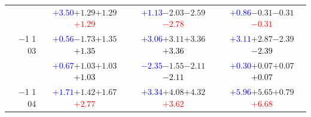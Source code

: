 \documentclass[compress]{beamer}
\begin{document}
\begin{frame}
\begin{tabular}{r | c | c | c}
          & \textcolor{blue}{$+3.50$}\hspace{0.1 cm}$+1.29$\hspace{0.1 cm}$+1.29$\hspace{0.1 cm}\textcolor{red}{$+1.29$} & \textcolor{blue}{$+1.13$}\hspace{0.1 cm}$-2.03$\hspace{0.1 cm}$-2.59$\hspace{0.1 cm}\textcolor{red}{$-2.78$} & \textcolor{blue}{$+0.86$}\hspace{0.1 cm}$-0.31$\hspace{0.1 cm}$-0.31$\hspace{0.1 cm}\textcolor{red}{$-0.31$} \\
$-$1 1 03 & \textcolor{blue}{$+0.56$}\hspace{0.1 cm}$-1.73$\hspace{0.1 cm}$+1.35$\hspace{0.1 cm}\textcolor{black}{$+1.35$} & \textcolor{blue}{$+3.06$}\hspace{0.1 cm}$+3.11$\hspace{0.1 cm}$+3.36$\hspace{0.1 cm}\textcolor{black}{$+3.36$} & \textcolor{blue}{$+3.11$}\hspace{0.1 cm}$+2.87$\hspace{0.1 cm}$-2.39$\hspace{0.1 cm}\textcolor{black}{$-2.39$} \\
          & \textcolor{blue}{$+0.67$}\hspace{0.1 cm}$+1.03$\hspace{0.1 cm}$+1.03$\hspace{0.1 cm}\textcolor{black}{$+1.03$} & \textcolor{blue}{$-2.35$}\hspace{0.1 cm}$-1.55$\hspace{0.1 cm}$-2.11$\hspace{0.1 cm}\textcolor{black}{$-2.11$} & \textcolor{blue}{$+0.30$}\hspace{0.1 cm}$+0.07$\hspace{0.1 cm}$+0.07$\hspace{0.1 cm}\textcolor{black}{$+0.07$} \\
$-$1 1 04 & \textcolor{blue}{$+1.71$}\hspace{0.1 cm}$+1.42$\hspace{0.1 cm}$+1.67$\hspace{0.1 cm}\textcolor{red}{$+2.77$} & \textcolor{blue}{$+3.34$}\hspace{0.1 cm}$+4.08$\hspace{0.1 cm}$+4.32$\hspace{0.1 cm}\textcolor{red}{$+3.62$} & \textcolor{blue}{$+5.96$}\hspace{0.1 cm}$+5.65$\hspace{0.1 cm}$+0.79$\hspace{0.1 cm}\textcolor{red}{$+6.68$} \\

\end{tabular}
\end{frame}
\end{document}
